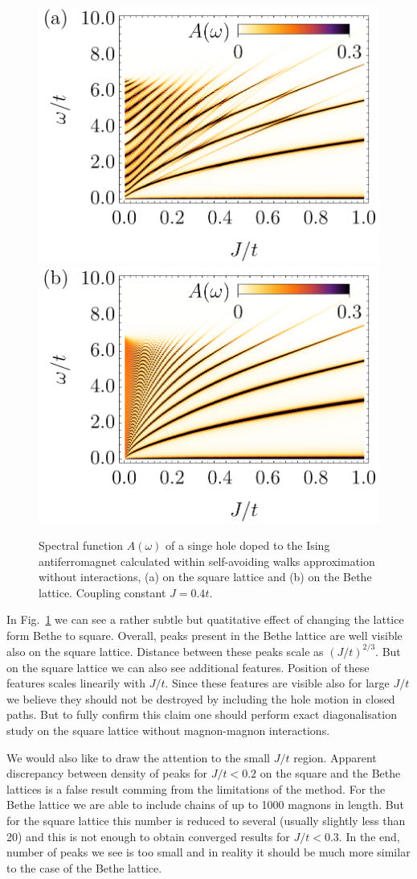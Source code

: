 \documentclass[%
 reprint,
 amsmath,amssymb,
 aps,
prb,
floatfix,
]{revtex4-1}
\begin{document}
\begin{figure}[ht!]
	\includegraphics[width=0.49\columnwidth]
	{./figures/square/Int64[]_noint.png}
	\includegraphics[width=0.49\columnwidth]
	{./figures/bethe/Int64[]_noint.png}
	\caption{
		Spectral function $A(\omega)$ of a singe hole doped to the Ising antiferromagnet calculated within self-avoiding walks approximation without interactions, (a) on the square lattice and (b) on the Bethe lattice. Coupling constant $J=0.4t$.
	}\label{fig:no_rot_no_mag}
\end{figure}

In Fig.~\ref{fig:no_rot_no_mag} we can see a rather subtle but quatitative effect of changing the lattice form Bethe to square. Overall, peaks present in the Bethe lattice are well visible also on the square lattice. Distance between these peaks scale as $(J/t)^{2/3}$. But on the square lattice we can also see additional features. Position of these features scales linearily with $J/t$. Since these features are visible also for large $J/t$ we believe they should not be destroyed by including the hole motion in closed paths. But to fully confirm this claim one should perform exact diagonalisation study on the square lattice without magnon-magnon interactions.

We would also like to draw the attention to the small $J/t$ region. Apparent discrepancy between density of peaks for $J/t < 0.2$ on the square and the Bethe lattices is a false result comming from the limitations of the method. For the Bethe lattice we are able to include chains of up to 1000 magnons in length. But for the square lattice this number is reduced to several (usually slightly less than 20) and this is not enough to obtain converged results for $J/t < 0.3$. In the end, number of peaks we see is too small and in reality it should be much more similar to the case of the Bethe lattice.
\end{document}
